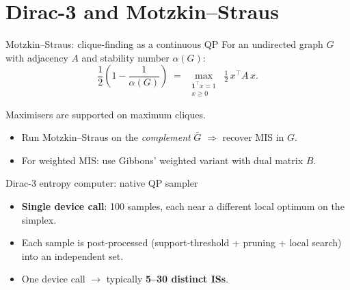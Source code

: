 \documentclass[aspectratio=169,11pt]{beamer}
\newcommand{\bestval}[1]{\textbf{\textcolor{qciteal}{#1}}}
\begin{document}
\section{Dirac-3 and Motzkin--Straus}

\begin{frame}{Motzkin--Straus: clique-finding as a continuous QP}
  For an undirected graph $G$ with adjacency $A$ and stability number $\alpha(G)$:
  \[
  \frac{1}{2}\!\left(1 - \frac{1}{\alpha(G)}\right)
  \;=\;
  \max_{\substack{\mathbf{1}^\top x = 1 \\ x \ge 0}}\; \tfrac{1}{2}\, x^\top A\, x.
  \]

  \medskip
  Maximisers are supported on \alert{maximum cliques}.
  \begin{itemize}\small
    \item Run Motzkin--Straus on the \emph{complement} $\bar G$ $\Longrightarrow$ recover MIS in $G$.
    \item For weighted MIS: use Gibbons' weighted variant with dual matrix $B$.
  \end{itemize}
\end{frame}

\begin{frame}{Dirac-3 entropy computer: native QP sampler}
  \centering

  \medskip
  \begin{itemize}\small
    \item \textbf{Single device call}: 100 samples, each near a different local
          optimum on the simplex.
    \item Each sample is post-processed (support-threshold + pruning +
          local search) into an independent set.
    \item One device call $\to$ typically \bestval{5--30 distinct ISs}.
  \end{itemize}
\end{frame}
\end{document}
